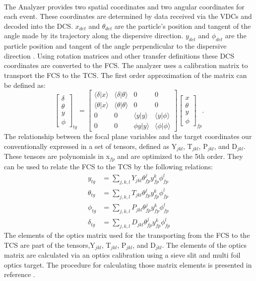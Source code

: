 \paragraph{} The Analyzer provides two spatial coordinates and two angular coordinates for each event. These coordinates are determined by data received via the VDCs and decoded into the DCS. $x_{det}$ and $\theta_{det}$ are the particle's position and tangent of the angle made by its trajectory along the dispersive direction. $y_{det}$ and $\phi_{det}$ are the particle position and tangent of the angle perpendicular to the dispersive direction \cite{optics}. Using rotation matrices and other transfer definitions these DCS coordinates are converted to the FCS. The analyzer uses a calibration matrix to transport the FCS to the TCS. The first order approximation of the matrix can be defined as:
\begin{equation}
\begin{bmatrix}
	\delta \\
	\theta \\
	y      \\
	\phi   
\end{bmatrix}_{tg}
=
\begin{bmatrix}
	\langle \delta \vert x \rangle &\langle \delta \vert \theta \rangle & 0 & 0\\
	\langle \theta \vert x \rangle &\langle \theta \vert \theta \rangle & 0 & 0\\
	0 & 0 & \langle y \vert y \rangle &\langle y \vert \phi \rangle\\
	0 & 0 & \phi y \vert y \rangle &\langle \phi \vert \phi \rangle
\end{bmatrix}
\begin{bmatrix}
	x     \\    
	\theta \\
	y      \\
	\phi   
\end{bmatrix}_{fp}.
\end{equation}
The relationship between the focal plane variables and the target coordinates our conventionally expressed in a set of tensors, defined as Y$_{jkl}$, T$_{jkl}$, P$_{jkl}$, and D$_{jkl}$. These tensors are polynomials in x$_{fp}$ and are optimized to the 5th order. They can be used to relate the FCS to the TCS by the following relations:
\begin{align}
y_{tg} &= \sum_{j,k,l} Y_{jkl}\theta^j_{fp}y^k_{fp}\phi^l_{fp} \\
\theta_{tg} &= \sum_{j,k,l} T_{jkl}\theta^j_{fp}y^k_{fp}\phi^l_{fp} \\
\phi_{tg} &= \sum_{j,k,l} P_{jkl}\theta^j_{fp}y^k_{fp}\phi^l_{fp}  \\
\delta_{tg} &= \sum_{j,k,l} D_{jkl}\theta^j_{fp}y^k_{fp}\phi^l_{fp} 
\end{align}
The elements of the optics matrix used for the transporting from the FCS to the TCS are part of the tensors,Y$_{jkl}$, T$_{jkl}$, P$_{jkl}$, and D$_{jkl}$. The elements of the optics matrix are calculated via an optics calibration using a sieve slit and multi foil optics target. The procedure for calculating those matrix elements is presented in reference \cite{optics}. 
